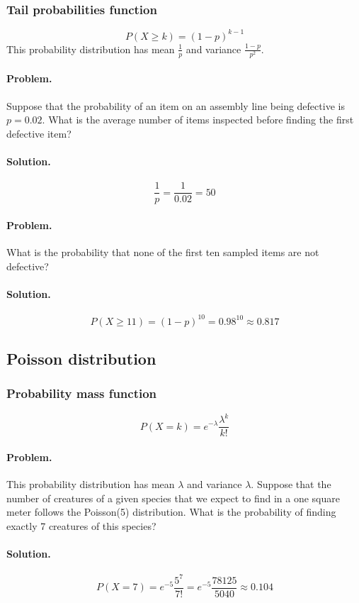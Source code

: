 \documentclass[12pt, oneside]{book}
\begin{document}
\subsubsection*{Tail probabilities function}
\[P(X \ge k) = (1 - p)^{k - 1}\]
This probability distribution has mean \(\frac{1}{p}\) and variance \(\frac{1 - p}{p^2}\).

\paragraph{Problem.}
Suppose that the probability of an item on an assembly
line being defective is \(p = 0.02\). What is the average number of items
inspected before finding the first defective item?
\paragraph{Solution.}
\[\frac{1}{p} = \frac{1}{0.02} = 50\]

\paragraph{Problem.}
What is the probability that none of the first ten sampled
items are not defective?
\paragraph{Solution.}
\[P(X \ge 11) = (1 - p)^{10} = 0.98^{10} \approx 0.817\]

\subsection{Poisson distribution}
\subsubsection*{Probability mass function}
\[P(X = k) = e^{-\lambda}\frac{\lambda^k}{k!}\]

\paragraph{Problem.}
This probability distribution has mean \(\lambda\) and variance \(\lambda\).
Suppose that the number of creatures of a given species that we expect to find
in a one square meter follows the Poisson(5) distribution. What is the
probability of finding exactly 7 creatures of this species?
\paragraph{Solution.}
\[P(X = 7) = e^{-5}\frac{5^7}{7!} = e^{-5}\frac{78125}{5040} \approx 0.104\]
\end{document}
